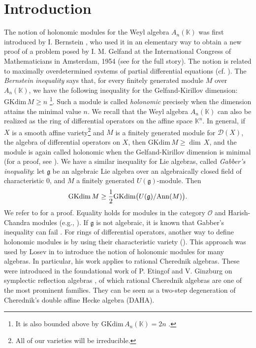 \documentclass[12pt, a4paper]{amsart}
\newcommand{\Weyl}{A_n(\mathbb{K})} %
\newcommand{\GKdim}{\text{GKdim}}    %
\newcommand{\Ann}{{\rm{Ann}}}
\def\D{\mathcal D}
\def\g{\mathfrak g}
\def\KK{\mathbb K}
\begin{document}
\section{Introduction}
The notion of holonomic modules for the Weyl algebra $\Weyl$ was first introduced by I. Bernstein \cite{INBernstein}, who used it in an elementary way to obtain a new proof of a problem posed by I. M. Gelfand at the International Congress of Mathematicians in Amsterdam, 1954 (see \cite[Chapter 8]{KL} for the full story). The notion is related to maximally overdetermined systems of partial differential equations (cf. \cite{Sato}).
The \textit{Bernstein inequality} says that, for every finitely generated module $M$ over $\Weyl$, we have the following inequality for the Gelfand-Kirillov dimension: $\GKdim \, M \geq n$ \footnote{It is also bounded above by $\GKdim \, \Weyl=2n$ \cite[Chapter 5]{KL}.}. Such a module is called \textit{holonomic} precisely when the dimension attains the minimal value $n$.
We recall that the Weyl algebra $\Weyl$ can also be realized as the ring of differential operators on the affine space $\KK^n$. In general, if $X$ is a smooth affine variety\footnote{All of our varieties will be irreducible.} and $M$ is a finitely generated module for $\D(X)$, the algebra of differential operators on $X$, then $\GKdim \, M \geq \dim \, X$, and the module is again called holonomic when the Gelfand-Kirillov dimension is minimal (for a proof, see \cite[Theorem 4.3]{McConnell}).
We have a similar inequality for Lie algebras, called \textit{Gabber's inequality}: let $\mathfrak{g}$ be an algebraic Lie algebra over an algebraically closed field of characteristic $0$, and $M$ a finitely generated $U(\g)$-module. Then
    \[
        \GKdim \, M \geq \frac{1}{2} \GKdim \big(U(\mathfrak{g})/\Ann(M)\big).
    \]
We refer to \cite[Theorem 9.11]{KL} for a proof. Equality holds for modules in the category $\mathcal{O}$ and Harish-Chandra modules (e.g., \cite{Jantzen}). If $\g$ is not algebraic, it is known that Gabber's inequality can fail \cite{McConnell3}.
For rings of differential operators, another way to define holonomic modules is by using their characteristic variety (\cite{Hotta}). This approach was used by Losev in \cite{Losev} to introduce the notion of holonomic modules for many algebras.
In particular, his work applies to rational Cherednik algebras. These were introduced in the foundational work of P. Etingof and V. Ginzburg on symplectic reflection algebras \cite{EG}, of which rational Cherednik algebras are one of the most prominent families. They can be seen as a two-step degeneration of Cherednik's double affine Hecke algebra (DAHA).
\end{document}
